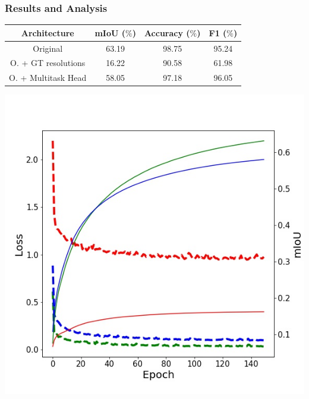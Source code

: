 \documentclass{beamer}
\begin{document}
\begin{frame}
\frametitle{Results and Analysis}

\begin{table}[h!]
  \begin{center}
    
    \begin{tabular}{|c|c|c|c|} %
      \textbf{Architecture} & \textbf{mIoU ($\%$)} & \textbf{Accuracy ($\%$)} & \textbf{F1 ($\%$)} \\
      \hline
      Original & 63.19 & 98.75 & 95.24\\
      \hline
      O. + GT resolutions & 16.22 & 90.58 & 61.98\\  
      \hline
      O. + Multitask Head & 58.05 & 97.18 & 96.05\\
    \end{tabular}
    
    \label{hourglass:table1}
  \end{center}
\end{table}

 
\begin{center}
\includegraphics[scale=0.25]{loss_plot_GTnormal.jpg}
\end{center}


\end{frame}
\end{document}
